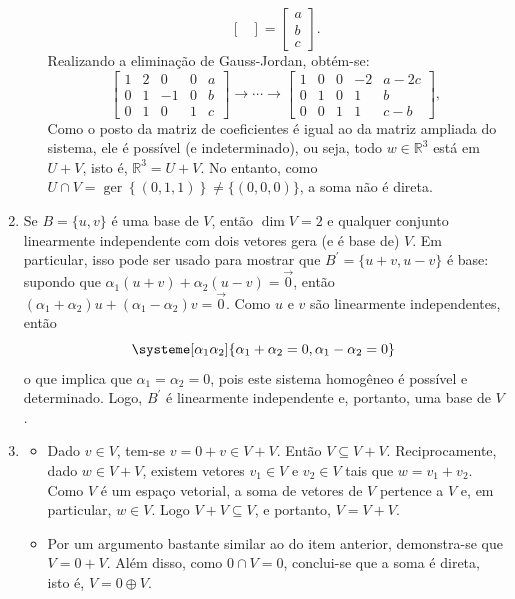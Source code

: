 \documentclass[12pt,a4paper]{article}
\newcommand*\ger[1]{\operatorname{ger}\left\{#1\right\}}
\newcommand*\R{\mathbb{R}}
\begin{document}
\begin{enumerate}
\begin{enumerate}
\[\begin{bmatrix}
\end{bmatrix}
=
\begin{bmatrix}
a\\b\\c
\end{bmatrix}.
\]
Realizando a eliminação de Gauss-Jordan, obtém-se:
\[
\begin{bmatrix}
1 & 2 & 0 & 0 & a \\
0 & 1 & -1 & 0 & b\\
0 & 1 & 0 & 1 & c
\end{bmatrix}
\rightarrow
\cdots
\rightarrow
\begin{bmatrix}
1 & 0 & 0 & -2 & a -2c \\
0 & 1 & 0 &  1 & b \\
0 & 0 & 1 &  1 & c-b
\end{bmatrix},
\]
Como o posto da matriz de coeficientes é igual ao da matriz ampliada do sistema, ele é possível (e indeterminado), ou seja, todo $w \in \R^3$ está em $U+V$, isto é, $\R^3 = U+V$. No entanto, como $U \cap V = \ger{ (0,1,1) } \neq \{ (0,0,0) \}$, a soma não é direta.
\end{enumerate}

\item Se $B = \{u, v\}$ é uma base de $V$, então $\dim{V} = 2$ e qualquer conjunto linearmente independente com dois vetores gera (e é base de) $V$. Em particular, isso pode ser usado para mostrar que  $B^\prime = \{ u+v, u-v \}$  é base: supondo que $\alpha_1 (u+v) + \alpha_2 (u-v) = \vec{0}$, então $(\alpha_1 +\alpha_2)u + (\alpha_1 -\alpha_2)v = \vec{0}$. Como $u$ e $v$ são linearmente independentes, então 
\[
\systeme[\alpha_1\alpha_2]{
\alpha_1 + \alpha_2 = 0,
\alpha_1 - \alpha_2 = 0
}
\]
o que implica que $\alpha_1 = \alpha_2 = 0$, pois este sistema homogêneo é possível e determinado. Logo, $B^\prime$ é linearmente independente e, portanto, uma base de $V$.

\item
\begin{itemize}
\item Dado $v \in V$, tem-se $v = 0 + v \in V + V$. Então $V \subseteq V + V$. Reciprocamente, dado $w \in V + V$, existem vetores $v_1 \in V$ e $v_2 \in V$ tais que $w = v_1 + v_2$. Como $V$ é um espaço vetorial, a soma de vetores de $V$ pertence a $V$ e, em particular, $w \in V$. Logo $V+V \subseteq V$, e portanto, $V = V + V$.
\item Por um argumento bastante similar ao do item anterior, demonstra-se que $V = 0 + V$. Além disso, como $0 \cap V = 0$, conclui-se que a soma é direta, isto é, $V = 0 \oplus V$.
\end{itemize}
\end{enumerate}
\end{document}
